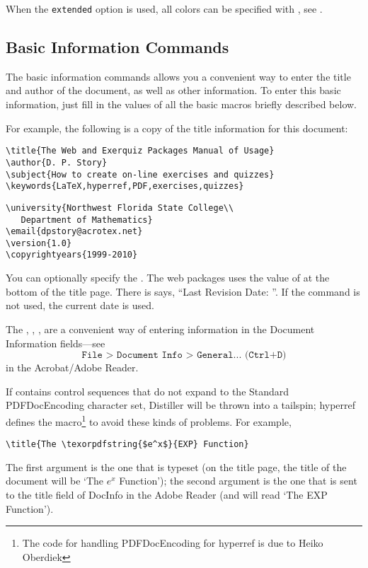 \documentclass{article}
\makeatletter
\let\pkg\textsf
\edef\amtIndent{\the\parindent}
\def\FitItIn{\eq@fititin}
\def\endredpoint{\FitItIn{{\large\ifusebw\color{black}\else\color{red}\fi$\blacktriangleleft$}}}
\makeatother
\begin{document}
{\redpoint When the \texttt{extended} option is used, all colors can be
specified with , see
.\endredpoint

\subsection{Basic Information Commands}\label{ss:BIM}

The basic information commands allows you a convenient way to enter the title and author
of the document, as well as other information. To enter this basic information,
just fill in the values of all the basic macros briefly described below.

For example, the following is a copy of the title information for this document:
\begin{Verbatim}[xleftmargin=\amtIndent]
% \title,\author,\subject,\keywords are sent to DocInfo
\title{The Web and Exerquiz Packages Manual of Usage}
\author{D. P. Story}
\subject{How to create on-line exercises and quizzes}
\keywords{LaTeX,hyperref,PDF,exercises,quizzes}
\end{Verbatim}

\begin{Verbatim}[xleftmargin=\amtIndent]
% \university,\email,\version are used only on title page
\university{Northwest Florida State College\\
   Department of Mathematics}
\email{dpstory@acrotex.net}
\version{1.0}
\copyrightyears{1999-2010}
\end{Verbatim}
You can optionally specify the . The web packages uses the value of 
at the bottom of the title page. There is says, ``Last Revision Date: ''. If
the  command is not used, the current date is used.

\redpoint The , , , 
are a convenient way of entering information in the Document
Information fields---see
\begin{equation*}
\texttt{File > Document Info > General... (Ctrl+D)}
\end{equation*}
in the Acrobat/Adobe Reader.\endredpoint

\newtopic\indent If  contains control sequences that do not expand to the
Standard PDFDocEncoding character set, Distiller will be thrown
into a tailspin; \pkg{hyperref} defines the 
macro\footnote{The code for handling PDFDocEncoding for
\pkg{hyperref} is due to Heiko Oberdiek} to avoid these kinds
of problems.  For example,
\begin{Verbatim}[xleftmargin=\amtIndent]
\title{The \texorpdfstring{$e^x$}{EXP} Function}
\end{Verbatim}
\noindent The first argument is the one that is typeset (on the title page,
the title of the document will be `The $e^x$ Function'); the
second argument is the one that is sent to the title field of
DocInfo in the Adobe Reader (and will read `The EXP Function').

}
\end{document}

